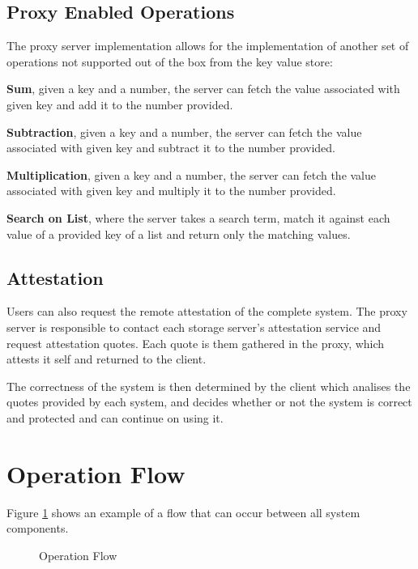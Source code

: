 \subsection{Proxy Enabled Operations}
\label{ssec:proxy_enabled_operations}

The proxy server implementation allows for the implementation of another set of operations not supported out of the box from the key value store:

\textbf{Sum}, given a key and a number, the server can fetch the value associated with given key and add it to the number provided.

\textbf{Subtraction}, given a key and a number, the server can fetch the value associated with given key and subtract it to the number provided.

\textbf{Multiplication}, given a key and a number, the server can fetch the value associated with given key and multiply it to the number provided.

\textbf{Search on List}, where the server takes a search term, match it against each value of a provided key of a list and return only the matching values.

\subsection{Attestation}
\label{ssec:attestation}

Users can also request the remote attestation of the complete system. The proxy server is responsible to contact each storage server's attestation service and request attestation quotes. Each quote is them gathered in the proxy, which attests it self and returned to the client. 

The correctness of the system is then determined by the client which analises the quotes provided by each system, and decides whether  or not the system is correct and protected and can continue on using it.

\section{Operation Flow}
\label{sec:operation_flow}

Figure \ref{fig:operation_flow} shows an example of a flow that can occur between all system components.

\begin{figure}[htbp]
  \caption{Operation Flow}
  \label{fig:operation_flow}
\end{figure}

